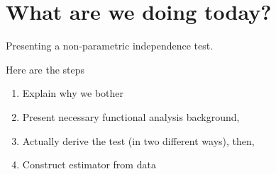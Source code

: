 %
\begin{flushright}
\end{flushright}
	\vspace{-46.5mm}
	{\bfseries\Large{\color{ETHtitleblue}\ETHtitle}}\par
    \vspace{-3.5mm}
    \Large\ETHsubtitle
\clearpage
\vspace*{-16.5mm}
\tableofcontents
\clearpage

\section{What are we doing today?}

Presenting a non-parametric independence test.

Here are the steps

\begin{enumerate}
	\item Explain why we bother
	\item Present necessary functional analysis background,
	\item Actually derive the test (in two different ways), then,
	\item Construct estimator from data
\end{enumerate}

